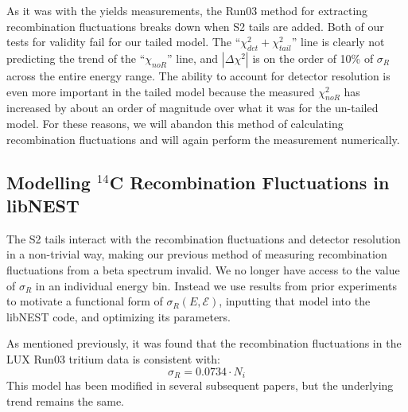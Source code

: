 As it was with the yields measurements, the Run03 method for extracting recombination fluctuations breaks down when S2 tails are added. Both of our tests for validity fail for our tailed model. The ``$\chi_{det}^2+\chi_{tail}^2$'' line is clearly not predicting the trend of the ``$\chi_{noR}$'' line, and $|\Delta\chi^2|$ is on the order of 10\% of $\sigma_{R}$ across the entire energy range. The ability to account for detector resolution is even more important in the tailed model because the measured $\chi_{noR}^2$ has increased by about an order of magnitude over what it was for the un-tailed model. For these reasons, we will abandon this method of calculating recombination fluctuations and will again perform the measurement numerically. 


\subsection{Modelling $^{14}$C Recombination Fluctuations in libNEST}\label{sec:sigrupdate}
The S2 tails interact with the recombination fluctuations and detector resolution in a non-trivial way, making our previous method of measuring recombination fluctuations from a beta spectrum invalid. We no longer have access to the value of $\sigma_R$ in an individual energy bin. Instead we use results from prior experiments to motivate a functional form of $\sigma_R(E,\mathcal{E})$, inputting that model into the libNEST code, and optimizing its parameters. 

As mentioned previously, it was found that the recombination fluctuations in the LUX Run03 tritium data is consistent with\cite{lux_tritium}:
\begin{equation}
\sigma_R=0.0734 \cdot N_i
\end{equation}
This model has been modified in several subsequent papers, but the underlying trend remains the same.


